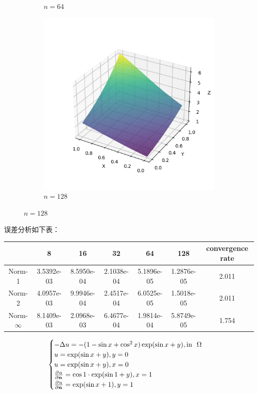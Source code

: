 \documentclass[lang=cn,a4paper,newtx,bibend=bibtex]{elegantpaper}
\begin{document}
\begin{figure}[H]
\begin{subfigure}[b]{0.18\textwidth}
      \caption{$n = 64$}
  \end{subfigure}
  \hfill
  \begin{subfigure}[b]{0.18\textwidth}
      \includegraphics[width=\textwidth]{../../res_bac/res-[data|1-Neumann-regular-e128].png}
      \caption{$n = 128$}
  \end{subfigure}
\end{figure}

误差分析如下表：

\begin{table}[H]
  \centering
  \begin{tabular}{|c|c|c|c|c|c|c|}
  \hline
   & 8 & 16 & 32 & 64 & 128 & convergence rate \\
  \hline
  Norm-1 & 3.5392e-03 & 8.5950e-04 & 2.1038e-04 & 5.1896e-05 & 1.2876e-05 & 2.011 \\
  Norm-2 & 4.0957e-03 & 9.9946e-04 & 2.4517e-04 & 6.0525e-05 & 1.5018e-05 & 2.011 \\
  Norm-$\infty$ & 8.1409e-03 & 2.0968e-03 & 6.4677e-04 & 1.9814e-04 & 5.8749e-05 & 1.754 \\
  \hline
  \end{tabular}
  \end{table}


\[
  \begin{cases}
    - \Delta u = -(1 - \sin x + \cos^2 x) \exp(\sin x + y), \text{in~~} \Omega \\
    u = \exp(\sin x + y), y = 0 \\
    u= \exp(\sin x + y), x = 0 \\
    \frac{\partial^{}{u}}{\partial {\bm{n}}^{}} = \cos 1 \cdot \exp(\sin 1 + y), x = 1 \\
    \frac{\partial^{}{u}}{\partial {\bm{n}}^{}} = \exp(\sin x + 1), y = 1
  \end{cases}
\]
\end{document}
